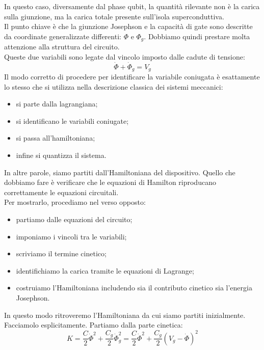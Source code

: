 In questo caso, diversamente dal phase qubit, la quantità rilevante non è la carica sulla giunzione, ma la carica totale presente sull'isola superconduttiva.\\
Il punto chiave è che la giunzione Josephson e la capacità di gate sono descritte da coordinate generalizzate differenti: $\Phi$ e $\Phi_g$. Dobbiamo quindi prestare molta attenzione alla struttura del circuito.\\
Queste due variabili sono legate dal vincolo imposto dalle cadute di tensione:
\begin{equation*}
    \dot{\Phi} + \dot{\Phi}_g = V_g
\end{equation*}
Il modo corretto di procedere per identificare la variabile coniugata è esattamente lo stesso che si utilizza nella descrizione classica dei sistemi meccanici:
\begin{itemize}[leftmargin=0.5cm]
    \item si parte dalla lagrangiana;
    \item si identificano le variabili coniugate;
    \item si passa all'hamiltoniana;
    \item infine si quantizza il sistema.
\end{itemize}
In altre parole, siamo partiti dall'Hamiltoniana del dispositivo. Quello che dobbiamo fare è verificare che le equazioni di Hamilton riproducano correttamente le equazioni circuitali.\\
Per mostrarlo, procediamo nel verso opposto:
\begin{itemize}[leftmargin=0.5cm]
    \item partiamo dalle equazioni del circuito;
    \item imponiamo i vincoli tra le variabili;
    \item scriviamo il termine cinetico;
    \item identifichiamo la carica tramite le equazioni di Lagrange;
    \item costruiamo l'Hamiltoniana includendo sia il contributo cinetico sia l'energia Josephson.
\end{itemize}
In questo modo ritroveremo l'Hamiltoniana da cui siamo partiti inizialmente.\\
Facciamolo esplicitamente. Partiamo dalla parte cinetica:
\begin{equation*}
    K
    =
    \frac{C}{2} \dot{\Phi}^2 + \frac{C_g}{2} \dot{\Phi}_g^2
    =
    \frac{C}{2} \dot{\Phi}^2 + \frac{C_g}{2} (V_g - \dot{\Phi})^2
\end{equation*}

